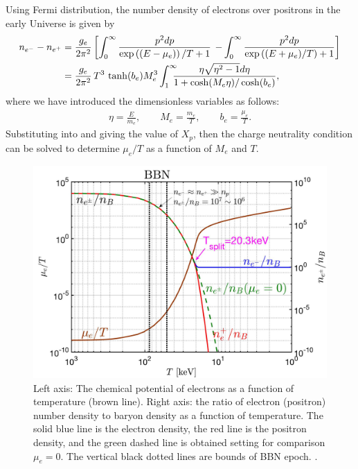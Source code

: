 Using Fermi distribution, the number density of electrons over positrons in the early Universe is given by
\begin{align}\label{ee_density}
n_{e^-}-n_{{e^+}}&=\frac{g_e}{2\pi^2}\left[\int_0^\infty\frac{p^2dp}{\exp{\left((E-\mu_e)\right)/T}+1}\right.\left.-\int_0^\infty\frac{p^2dp}{\exp{\left((E+\mu_e)/T\right)}+1}\right]\notag\\
&=\frac{g_e}{2\pi^2}\,{T^3}\,\tanh(b_e)M_e^3\int_{1}^\infty \!\!\!\!\frac{ \eta \sqrt{\eta^2-1} d\eta}{1+\cosh(M_e\eta)/\cosh(b_e)},
\end{align}
where we have introduced the dimensionless variables as follows: 
\begin{align}\label{Variables}
\eta=\frac{E}{m_e},\qquad M_e=\frac{m_e}{T},\qquad b_e=\frac{\mu_e}{T}.
\end{align}
Substituting  into  and giving the value of $X_p$, then the charge neutrality condition can be solved to determine $\mu_e/T$ as a function of $M_e$ and $T$. 

\begin{figure}
\centerline{\includegraphics[width=0.90\linewidth]{plots/chap03BBN/May152023_EPDensity_Chemical}}
\caption{Left axis: The chemical potential of electrons as a function of temperature (brown line). Right axis: the ratio of electron (positron) number density to baryon density as a function of temperature. The solid blue line is the electron density, the red  line is the positron density, and the green dashed line is obtained setting for comparison $\mu_e=0$. The vertical black dotted lines are bounds of BBN epoch. . }
\label{BBN:Electron}
\end{figure}

